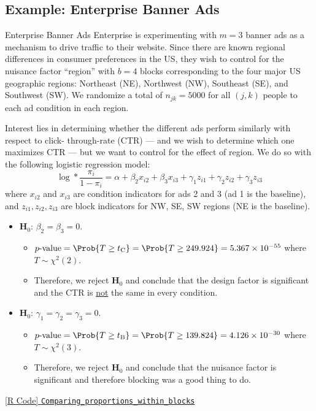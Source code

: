 \subsection{Example: Enterprise Banner Ads}
\begin{Example}{Enterprise Banner Ads}{}
      Enterprise is experimenting with $m = 3$ banner ads as a mechanism to drive traffic to their website. Since
      there are known regional differences in consumer preferences in the US, they wish to control for the nuisance
      factor ``region'' with $b = 4$ blocks corresponding to the four major US geographic regions: Northeast (NE),
      Northwest (NW), Southeast (SE), and Southwest (SW). We randomize a total of $n_{jk} = 5000$ for all $ (j,k) $ people
      to each ad condition in each region.

      \vspace{2mm}

      Interest lies in determining whether the different ads perform similarly with respect to click-
      through-rate (CTR) --- and we wish to determine which one maximizes CTR --- but we want to control for
      the effect of region. We do so with the following logistic regression model:
      \[ \log*{\frac{\pi_i}{1-\pi_i}}=\alpha+\beta_2 x_{i2}+\beta_3 x_{i3}+\gamma_1 z_{i1}+\gamma_2 z_{i2}+\gamma_3 z_{i3} \]
      where $ x_{i2} $ and $ x_{i3} $ are condition indicators for ads 2 and 3 (ad 1 is the baseline),
      and $ z_{i1},z_{i2},z_{i3} $ are block indicators for NW, SE, SW regions (NE is the baseline).
      \begin{itemize}
            \item $ \mathbf{H}_0 $: $ \beta_2=\beta_3=0 $.
                  \begin{itemize}
                        \item $ p\text{-value}=\Prob{T\ge t_\text{C}}=\Prob{T\ge 249.924}=5.367\times 10^{-55} $ where $ T \sim \chi^2(2) $.
                        \item Therefore, we reject $ \mathbf{H}_0 $ and conclude that the design factor is significant and the CTR is \underline{not}
                              the same in every condition.
                  \end{itemize}
            \item $ \mathbf{H}_0 $: $ \gamma_1=\gamma_2=\gamma_3=0 $.
                  \begin{itemize}
                        \item $ p\text{-value}=\Prob{T\ge t_\text{B}}=\Prob{T\ge 139.824}=4.126\times 10^{-30} $ where $ T \sim \chi^2(3) $.
                        \item Therefore, we reject $ \mathbf{H}_0 $ and conclude that the nuisance factor is significant
                              and therefore blocking was a good thing to do.
                  \end{itemize}
      \end{itemize}
      \href{https://github.com/Hextical/university-notes/blob/master/year-3/semester-3/STAT 430/code/W5/Comparing_proportions_within_blocks.R}{[R Code] \texttt{Comparing\_proportions\_within\_blocks}}
\end{Example}

